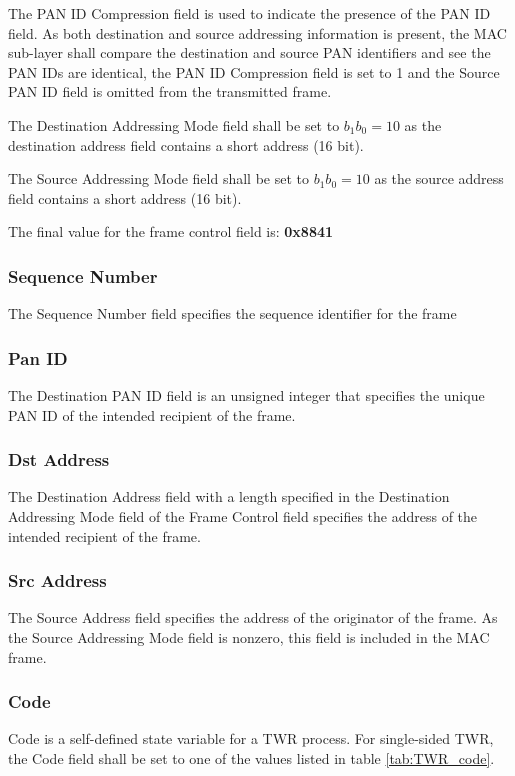 \documentclass[\main/main.tex]{subfiles}
\begin{document}
The PAN ID Compression field is used to indicate the presence of the PAN ID field. As both destination and source addressing information is present, the MAC sub-layer shall compare the destination and source PAN identifiers and see the PAN IDs are identical, the PAN ID Compression field is set to 1 and the Source PAN ID field is omitted from the transmitted frame. 

The Destination Addressing Mode field shall be set to  $b_1 b_0 = 10$ as the destination address field contains a short address (16 bit).

The Source Addressing Mode field shall be set to  $b_1 b_0 = 10$ as the source address field contains a short address (16 bit).

The final value for the frame control field is: \textbf{0x8841}
\subsubsection{Sequence Number}
The Sequence Number field specifies the sequence identifier for the frame

\subsubsection{Pan ID}
The Destination PAN ID field is an unsigned integer that specifies the unique PAN ID of the intended recipient of the frame. 

\subsubsection{Dst Address}
The Destination Address field with a length specified in the Destination Addressing Mode field of the Frame Control field specifies the address of the intended recipient of the frame.

\subsubsection{Src Address}
The Source Address field specifies the address of the originator of the frame. As the Source Addressing Mode field is nonzero, this field is included in the MAC frame.

\subsubsection{Code}
Code is a self-defined state variable for a TWR process. For single-sided TWR, the Code field shall be set to one of the values listed in table \ref{tab:TWR_code}.
\end{document}
